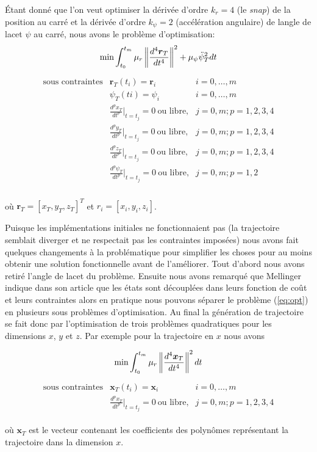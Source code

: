 Étant donné que l'on veut optimiser la dérivée d'ordre $k_r = 4$ (le \textit{snap}) de la position au carré et la dérivée d'ordre $k_\psi = 2$ (accélération angulaire) de langle de lacet $\psi$ au carré, nous avons le problème d'optimisation:
\begin{align}\label{eq:opt}
\text{min} \int_{t_0}^{t_m} \mu_r \left\lVert\frac{d^4 \boldsymbol{r}_T}{dt^4}\right\rVert^2 + \mu_\psi {\ddot{\psi}_T}^2 dt
\end{align}\begin{align*}
	\begin{array}{lll}
		\text{sous contraintes} & \boldsymbol{r}_T(t_i) = \boldsymbol{r}_i & i = 0, \ldots, m\\
		& \psi_T(ti)=\psi_i & i = 0, \ldots, m\\
		& \frac{d^p x_T}{dt^p}|_{t=t_j} = 0\ \text{ou libre,} & j = 0, m; p = 1, 2, 3, 4\\
		& \frac{d^p y_T}{dt^p}|_{t=t_j} = 0\ \text{ou libre,} & j = 0, m; p = 1, 2, 3, 4\\
		& \frac{d^p z_T}{dt^p}|_{t=t_j} = 0\ \text{ou libre,} & j = 0, m; p = 1, 2, 3, 4\\
		& \frac{d^p \psi_T}{dt^p}|_{t=t_j} = 0\ \text{ou libre,} & j = 0, m; p = 1, 2\\
	\end{array}
\end{align*}

où $\boldsymbol{r}_T = [x_T, y_T, z_T]^T$ et $r_i = [x_i, y_i, z_i]$.

Puisque les implémentations initiales ne fonctionnaient pas (la trajectoire semblait diverger et ne respectait pas les contraintes imposées) nous avons fait quelques changements à la problématique pour simplifier les choses pour au moins obtenir une solution fonctionnelle avant de l'améliorer. Tout d'abord nous avons retiré l'angle de lacet du problème. Ensuite nous avons remarqué que Mellinger indique dans son article que les états sont découplées dans leurs fonction de coût et leurs contraintes alors en pratique nous pouvons séparer le problème (\ref{eq:opt}) en plusieurs sous problèmes d'optimisation. Au final la génération de trajectoire se fait donc par l'optimisation de trois problèmes quadratiques pour les dimensions $x$, $y$ et $z$. Par exemple pour la trajectoire en $x$ nous avons

\begin{align}\label{eq:opt_x}
\text{min} \int_{t_0}^{t_m} \mu_r \left\lVert\frac{d^4 \boldsymbol{x}_T}{dt^4}\right\rVert^2 dt
\end{align}\begin{align*}
	\begin{array}{lll}
		\text{sous contraintes} & \boldsymbol{x}_T(t_i) = \boldsymbol{x}_i & i = 0, \ldots, m\\
		& \frac{d^p x_T}{dt^p}|_{t=t_j} = 0\ \text{ou libre,} & j = 0, m; p = 1, 2, 3, 4
	\end{array}
\end{align*}

où $\boldsymbol{x}_T$ est le vecteur contenant les coefficients des polynômes représentant la trajectoire dans la dimension $x$.
